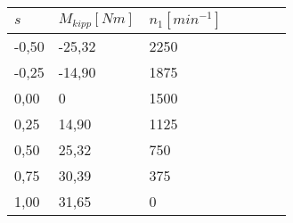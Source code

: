 \begin{table}[htbp]
    \centering
    \begin{tabularx}{\columnwidth}{XXXXXXX}
        \toprule
        $s$   & $M_{kipp}[Nm]$ & $n_1[min^{-1}]$ \\
        \midrule
        -0,50 & -25,32  & 2250            \\
        -0,25 & -14,90  & 1875            \\
        0,00  & 0       & 1500            \\
        0,25  & 14,90   & 1125            \\
        0,50  & 25,32   & 750             \\
        0,75  & 30,39   & 375             \\
        1,00  & 31,65   & 0               \\
        \bottomrule
    \end{tabularx}
    \caption{}
    \label{tab:M_kipp-mit-laeufervorwiderstand}
\end{table}
